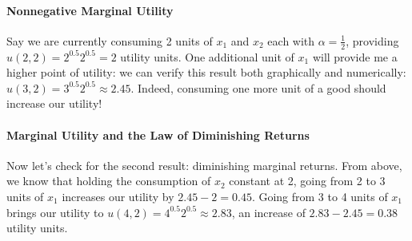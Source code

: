 \documentclass[letterpaper,10pt,english]{jupyterBook}
\begin{document}
\paragraph{Non\sphinxhyphen{}negative Marginal Utility}
\label{\detokenize{content/05-utility/utility:non-negative-marginal-utility}}
\sphinxAtStartPar
Say we are currently consuming 2 units of \(x_1\) and \(x_2\) each with \(\alpha = \frac{1}{2}\), providing \(u(2,2)=2^{0.5}2^{0.5}=2\) utility units. One additional unit of \(x_1\) will provide me a higher point of utility: we can verify this result both graphically and numerically: \(u(3,2)=3^{0.5}2^{0.5}\approx2.45\). Indeed, consuming one more unit of a good should increase our utility!


\paragraph{Marginal Utility and the Law of Diminishing Returns}
\label{\detokenize{content/05-utility/utility:marginal-utility-and-the-law-of-diminishing-returns}}
\sphinxAtStartPar
Now let’s check for the second result: diminishing marginal returns. From above, we know that holding the consumption of \(x_2\) constant at 2, going from 2 to 3 units of \(x_1\) increases our utility by \(2.45-2=0.45\). Going from 3 to 4 units of \(x_1\) brings our utility to \(u(4,2)=4^{0.5}2^{0.5}\approx 2.83\), an increase of \(2.83-2.45=0.38\) utility units.
\end{document}
